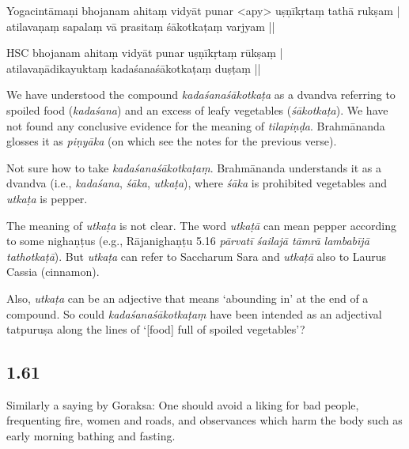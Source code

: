 \begin{ekdosis}
\begin{sources}[hp01_060]
\end{sources}

\begin{testimonia}[hp01_060]
Yogacintāmaṇi
\startverse
bhojanam ahitaṃ vidyāt punar <apy> uṣṇīkṛtaṃ tathā rukṣam |\\
atilavaṇaṃ sapalaṃ vā prasitaṃ śākotkaṭaṃ varjyam ||
\endverse

HSC
\startverse
bhojanam ahitaṃ vidyāt punar uṣṇīkṛtaṃ rūkṣaṃ | \\
atilavaṇādikayuktaṃ kadaśanaśākotkaṭaṃ duṣṭaṃ ||
\endverse
\end{testimonia}

\begin{philcomm}[hp01_060]
We have understood the compound \emph{kadaśanaśākotkaṭa} as a dvandva referring to spoiled food (\emph{kadaśana}) and an excess of leafy vegetables (\emph{śākotkaṭa}).
We have not found any conclusive evidence for the meaning of \emph{tilapiṇḍa}. Brahmānanda glosses it as \emph{piṇyāka} (on which see the notes for the previous verse).

Not sure how to take \emph{kadaśanaśākotkaṭaṃ}. Brahmānanda understands it as a dvandva (i.e., \emph{kadaśana}, \emph{śāka}, \emph{utkaṭa}), where \emph{śāka} is prohibited vegetables and \emph{utkaṭa} is pepper.

The meaning of \emph{utkaṭa} is not clear. The word \emph{utkaṭā} can mean pepper according to some nighaṇṭus (e.g., Rājanighaṇṭu 5.16 \emph{pārvatī śailajā tāmrā lambabījā tathotkaṭā}). But \emph{utkaṭa} can refer to Saccharum Sara and \emph{utkaṭā} also to Laurus Cassia (cinnamon).

Also, \emph{utkaṭa} can be an adjective that means ‘abounding in’ at the end of a compound. So could \emph{kadaśanaśākotkaṭaṃ} have been intended as an adjectival tatpuruṣa along the lines of ‘[food] full of spoiled vegetables’?
\end{philcomm}

\subsection*{1.61}
\begin{translation}[hp01_061]
Similarly a saying by Goraksa:
One should avoid a liking for bad people, frequenting fire, women and roads, and observances which harm the body such as early morning bathing and fasting.
\end{translation}


\end{ekdosis}
